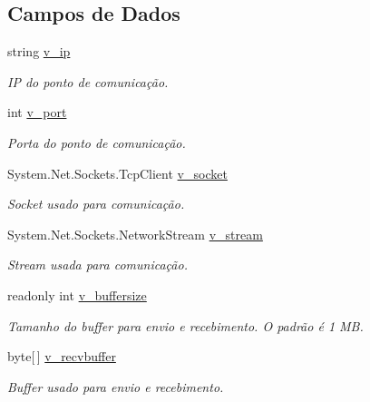 \subsection*{Campos de Dados}
\begin{DoxyCompactItemize}
\item 
string \hyperlink{classSpartacus_1_1Net_1_1Endpoint_a82ff144ce1df33989e110dc16dfd6ec7}{v\+\_\+ip}
\begin{DoxyCompactList}\small\item\em I\+P do ponto de comunicação. \end{DoxyCompactList}\item 
int \hyperlink{classSpartacus_1_1Net_1_1Endpoint_a70e8d6856b79d128208f3175cf00166f}{v\+\_\+port}
\begin{DoxyCompactList}\small\item\em Porta do ponto de comunicação. \end{DoxyCompactList}\item 
System.\+Net.\+Sockets.\+Tcp\+Client \hyperlink{classSpartacus_1_1Net_1_1Endpoint_afcd542885167aee45f37ea3001de130a}{v\+\_\+socket}
\begin{DoxyCompactList}\small\item\em Socket usado para comunicação. \end{DoxyCompactList}\item 
System.\+Net.\+Sockets.\+Network\+Stream \hyperlink{classSpartacus_1_1Net_1_1Endpoint_aae1759d93346f39b926884b5ac3544cd}{v\+\_\+stream}
\begin{DoxyCompactList}\small\item\em Stream usada para comunicação. \end{DoxyCompactList}\item 
readonly int \hyperlink{classSpartacus_1_1Net_1_1Endpoint_aeeae98f80d493442d5f50447339d16d9}{v\+\_\+buffersize}
\begin{DoxyCompactList}\small\item\em Tamanho do buffer para envio e recebimento. O padrão é 1 M\+B. \end{DoxyCompactList}\item 
byte\mbox{[}$\,$\mbox{]} \hyperlink{classSpartacus_1_1Net_1_1Endpoint_ae3632e1b74fb0004d1c7fde3b04c8b29}{v\+\_\+recvbuffer}
\begin{DoxyCompactList}\small\item\em Buffer usado para envio e recebimento. \end{DoxyCompactList}\end{DoxyCompactItemize}


